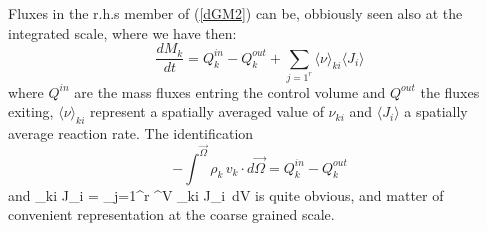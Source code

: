 Fluxes in the r.h.s member of (\ref{dGM2}) can be, obbiously seen also at the integrated scale, where we have then:
\begin{equation}
\frac{dM_k}{dt} = Q_k^{in} - Q_k^{out} + \sum_{j=1^r} \langle\nu \rangle_{ki} \langle J_i \rangle
\end{equation}
where $Q^{in}$ are the mass fluxes entring the control volume and $Q^{out}$ the fluxes exiting, $\langle\nu \rangle_{ki}$ represent a spatially averaged value of $\nu_{ki}$ and $\langle J_i \rangle$ a spatially average reaction rate.
The identification 
\begin{equation}
- \int^\vec{\Omega} \rho_k\, v_k \cdot d\vec{\Omega} = Q_k^{in} - Q_k^{out}
\end{equation}
and 
\langle\nu \rangle_{ki} \langle J_i \rangle = \sum_{j=1}^r \int^V \nu_{ki} J_i\, dV
is quite obvious, and matter of convenient representation at the coarse grained scale. 